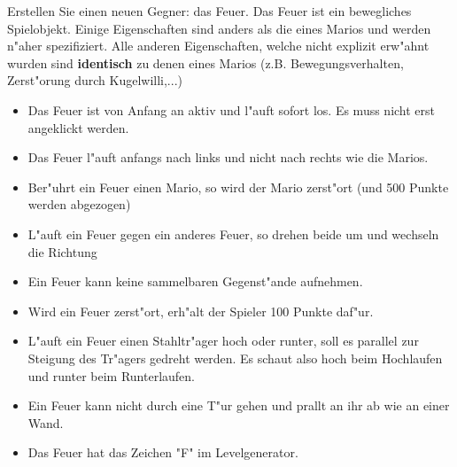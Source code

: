 Erstellen Sie einen neuen Gegner: das Feuer. Das Feuer ist ein bewegliches Spielobjekt. Einige Eigenschaften sind anders als die eines Marios und werden n"aher spezifiziert. 
Alle anderen Eigenschaften, welche nicht explizit erw"ahnt wurden sind \textbf{identisch} zu denen eines Marios (z.B. Bewegungsverhalten, Zerst"orung durch Kugelwilli,...) 

\begin{itemize}
\item Das Feuer ist von Anfang an aktiv und l"auft sofort los. Es muss nicht erst angeklickt werden.
\item Das Feuer l"auft anfangs nach links und nicht nach rechts wie die Marios.
\item Ber"uhrt ein Feuer einen Mario, so wird der Mario zerst"ort (und 500 Punkte werden abgezogen)
\item L"auft ein Feuer gegen ein anderes Feuer, so drehen beide um und wechseln die Richtung
\item Ein Feuer kann keine sammelbaren Gegenst"ande aufnehmen.
\item Wird ein Feuer zerst"ort, erh"alt der Spieler 100 Punkte daf"ur.
\item L"auft ein Feuer einen Stahltr"ager hoch oder runter, soll es parallel zur Steigung des Tr"agers gedreht werden. Es schaut also hoch beim Hochlaufen und runter beim Runterlaufen.
\item Ein Feuer kann nicht durch eine T"ur gehen und prallt an ihr ab wie an einer Wand.
\item Das Feuer hat das Zeichen "F" im Levelgenerator.
\end{itemize}


